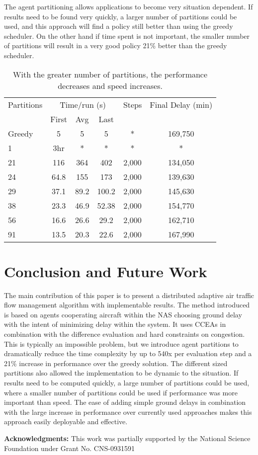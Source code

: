 \documentclass{sig-alternate}
\begin{document}
The agent partitioning allows applications to become very situation dependent. If results need to be found very quickly, a larger number of partitions could be used, and this approach will find a policy still better than using the greedy scheduler. On the other hand if time spent is not important, the smaller number of partitions will result in a very good policy 21\% better than the greedy scheduler. 
\vspace{-5pt}
\begin{table}[tbh!]
\begin{tabular}{|l|c|c|c|c|c|}
\hline
Partitions & \multicolumn{3}{|c|}{Time/run (s)} & Steps &Final Delay (min)\\
&First&Avg&Last&&\\
\hline
Greedy & 5 & 5 & 5 & * & 169,750 \\
\hline
1 & 3hr & * & * & * &* \\
\hline
21 & 116 & 364 & 402 & 2,000 & 134,050\\
\hline
24 & 64.8 & 155 & 173 & 2,000 & 139,630\\	
\hline
29 & 37.1 & 89.2 & 100.2 & 2,000 & 145,630\\
\hline
38 & 23.3 & 46.9 & 52.38 & 2,000 & 154,770\\
\hline
56 & 16.6 & 26.6 & 29.2 & 2,000 & 162,710\\
\hline
91 & 13.5 & 20.3 & 22.6 & 2,000 & 167,990\\
\hline
\end{tabular}
\caption{With the greater number of partitions, the performance decreases and speed increases.}
\label{TimingTable}
\end{table}

\vspace{-15pt}
\section{Conclusion and Future Work}
The main contribution of this paper is to present a distributed adaptive air traffic flow management algorithm with implementable results. The method introduced is based on agents cooperating aircraft within the NAS choosing ground delay with the intent of minimizing delay within the system. It uses CCEAs in combination with the difference evaluation and hard constraints on congestion. This is typically an impossible problem, but we introduce agent partitions to dramatically reduce the time complexity by up to 540x per evaluation step and a 21\% increase in performance over the greedy solution. The different sized partitions also allowed the implementation to be dynamic to the situation. If results need to be computed quickly, a large number of partitions could be used, where a smaller number of partitions could be used if performance was more important than speed. The ease of adding simple ground delays in combination with the large increase in performance over currently used approaches makes this approach easily deployable and effective.

\textbf{Acknowledgments:} This work was partially  supported by the National Science Foundation  under Grant No. CNS-0931591 
\vspace{-5pt}
{}

\end{document}
